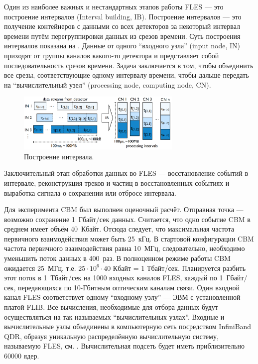 Один из наиболее важных и нестандартных этапов работы FLES --- это построение интервалов (Interval building, IB). Построение интервалов --- это получение контейнеров с данными со всех детекторов за некоторый интервал времени путём перегруппировки данных из срезов времени. Суть построения интервалов показана на . Данные от одного ``входного узла'' (input node, IN) приходят от группы каналов какого-то детектора и представляет собой последовательность срезов времени. Задача заключается в том, чтобы объединить все срезы, соответствующие одному интервалу времени, чтобы дальше передать на ``вычислительный узел'' (processing node, computing node, CN).

\begin{figure}[H]
\centering
\includegraphics[width=0.7\textwidth]{pictures/Interval_building.png}
\caption{Построение интервала.}
\label{fig:IntervalBuilding}
\end{figure}

Заключительный этап обработки данных во FLES --- восстановление событий в интервале, реконструкция треков и частиц в восстановленных событиях и выработка сигнала о сохранении или отбросе интервала.

Для эксперимента CBM был выполнен оценочный расчёт. Отправная точка --- возможно сохранение 1~Гбайт/сек данных. Считается, что одно событие CBM в среднем имеет объём 40~Кбайт. Отсюда следует, что максимальная частота первичного взаимодействия может быть 25~кГц. В стартовой конфигурации CBM частота первичного взаимодействия равна 10~МГц, следовательно, необходимо уменьшить поток данных в 400~раз. В полноценном режиме работы CBM ожидается 25~МГц, т.е. $ 25 \cdot 10^{6} \cdot 40 $ Кбайт = 1 Тбайт/сек. Планируется разбить этот поток в 1~Тбайт/сек на 1000 входных каналов FLES, каждый по 1~Гбайт/сек, передающихся по 10-Гбитным оптическим каналам связи. Один входной канал FLES соответствует одному ``входному узлу'' --- ЭВМ с установленной платой FLIB. Все вычисления, необходимые для отбора данных будут осуществляться на так называемых ``вычислительных узлах''. Входные и вычислительные узлы объединены в компьютерную сеть посредством InfiniBand QDR, образуя уникальную распределённую вычислительную систему, называемую FLES, см. . Вычислительная подсеть будет иметь приблизительно 60000 ядер.

